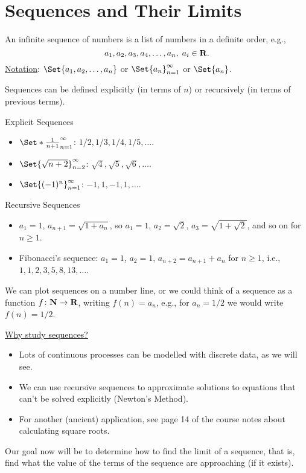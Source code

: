 \section{Sequences and Their Limits}
\begin{Definition}{}{}
    An infinite sequence of numbers is a list of numbers in a definite order, e.g.,
    \[ a_1,a_2,a_3,a_4,\ldots,a_n,\; a_i\in\mathbf{R}. \]
    \underline{Notation}: $ \Set{a_1,a_2,\ldots,a_n} $ or $ \Set{a_n}_{n=1}^{\infty} $ or $ \Set{a_n} $.
\end{Definition}
Sequences can be defined explicitly (in terms of $ n $) or recursively (in terms of previous terms).
\begin{Example}{Explicit Sequences}{}
    \begin{itemize}
        \item $ \Set*{\frac{1}{n+1}}_{n=1}^{\infty} $: $ 1/2,1/3,1/4,1/5,\ldots $.
        \item $ \Set{\sqrt{n+2}}_{n=2}^{\infty} $: $ \sqrt{4},\sqrt{5},\sqrt{6},\ldots $.
        \item $ \Set{(-1)^n}_{n=1}^\infty $: $ -1,1,-1,1,\ldots $.
    \end{itemize}
\end{Example}
\begin{Example}{Recursive Sequences}{}
    \begin{itemize}
        \item $ a_1=1 $, $ a_{n+1}=\sqrt{1+a_n} $, so $ a_1=1 $, $ a_2=\sqrt{2} $, $ a_3=\sqrt{1+\sqrt{2}} $, and so on for $ n\ge 1 $.
        \item Fibonacci's sequence: $ a_1=1 $, $ a_2=1 $, $ a_{n+2}=a_{n+1}+a_n $ for $ n\ge 1 $, i.e.,
              $ 1,1,2,3,5,8,13,\ldots $.
    \end{itemize}
\end{Example}
We can plot sequences on a number line, or we could think of a sequence as a function $ f\colon \mathbf{N}\to\mathbf{R} $, writing $ f(n)=a_n $, e.g.,
for $ a_n=1/2 $ we would write $ f(n)=1/2 $.

\underline{Why study sequences?}
\begin{itemize}
    \item Lots of continuous processes can be modelled with discrete data, as we will see.
    \item We can use recursive sequences to approximate solutions to equations that can't be solved explicitly (Newton's Method).
    \item For another (ancient) application, see page 14 of the course notes about calculating square roots.
\end{itemize}
Our goal now will be to determine how to find the limit of a sequence, that is, find what the value of the terms of the sequence
are approaching (if it exists).

